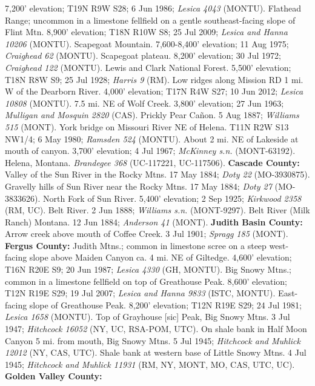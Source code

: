 7,200' elevation; T19N R9W S28; 6 Jun 1986; \textit{Lesica 4043} (MONTU).
Flathead Range; uncommon in a limestone fellfield on a gentle southeast-facing
slope of Flint Mtn. 8,900' elevation; T18N R10W S8; 25 Jul 2009;
\textit{Lesica and Hanna 10206} (MONTU).
Scapegoat Mountain. 7,600-8,400' elevation; 11 Aug 1975;
\textit{Craighead 62} (MONTU).
Scapegoat plateau. 8,200' elevation; 30 Jul 1972;
\textit{Craighead 122} (MONTU).
Lewis and Clark National Forest. 5,500' elevation; T18N R8W S9; 25 Jul 1928;
\textit{Harris 9} (RM).
Low ridges along Mission RD 1 mi. W of the Dearborn River. 4,000' elevation;
T17N R4W S27; 10 Jun 2012; \textit{Lesica 10808} (MONTU).
7.5 mi. NE of Wolf Creek. 3,800' elevation; 27 Jun 1963;
\textit{Mulligan and Mosquin 2820} (CAS).
Prickly Pear Cañon. 5 Aug 1887; \textit{Williams 515} (MONT).
York bridge on Missouri River NE of Helena. T11N R2W S13 NW1/4; 6 May 1980;
\textit{Ramsden 524} (MONTU).
About 2 mi. NE of Lakeside at mouth of canyon. 3,700' elevation; 4 Jul 1967;
\textit{McKinney s.n.} (MONT-63192).
Helena, Montana. \textit{Brandegee 368} (UC-117221, UC-117506).
  \textbf{Cascade County:}
Valley of the Sun River in the Rocky Mtns. 17 May 1884;
\textit{Doty 22} (MO-3930875).
Gravelly hills of Sun River near the Rocky Mtns. 17 May 1884;
\textit{Doty 27} (MO-3833626).
North Fork of Sun River. 5,400' elevation; 2 Sep 1925;
\textit{Kirkwood 2358} (RM, UC).
Belt River. 2 Jun 1888; \textit{Williams s.n.} (MONT-9297).
Belt River (Milk Ranch) Montana. 12 Jun 1884; \textit{Anderson 41} (MONT).
  \textbf{Judith Basin County:}
Arrow creek above mouth of Coffee Creek. 3 Jul 1901; \textit{Spragg 185} (MONT).
  \textbf{Fergus County:}
Judith Mtns.; common in limestone scree on a steep west-facing slope above
Maiden Canyon ca. 4 mi. NE of Giltedge. 4,600' elevation; T16N R20E S9;
20 Jun 1987; \textit{Lesica 4330} (GH, MONTU).
Big Snowy Mtns.; common in a limestone fellfield on top of Greathouse Peak.
8,600' elevation; T12N R19E S29; 19 Jul 2007;
\textit{Lesica and Hanna 9833} (ISTC, MONTU).
East-facing slope of Greathouse Peak. 8,200' elevation; T12N R19E S29;
24 Jul 1981; \textit{Lesica 1658} (MONTU).
Top of Grayhouse [sic] Peak, Big Snowy Mtns. 3 Jul 1947;
\textit{Hitchcock 16052} (NY, UC, RSA-POM, UTC).
On shale bank in Half Moon Canyon 5 mi. from mouth, Big Snowy Mtns. 5 Jul 1945;
\textit{Hitchcock and Muhlick 12012} (NY, CAS, UTC).
Shale bank at western base of Little Snowy Mtns. 4 Jul 1945;
\textit{Hitchcock and Muhlick 11931} (RM, NY, MONT, MO, CAS, UTC, UC).
  \textbf{Golden Valley County:}

